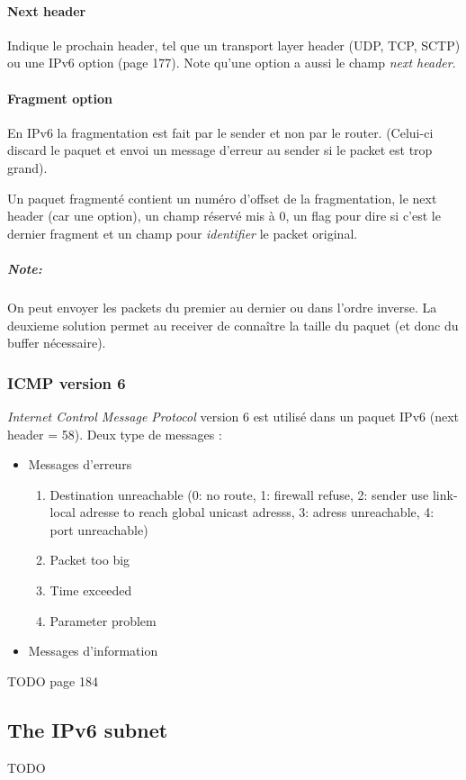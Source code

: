 \paragraph{Next header}
Indique le prochain header, tel que un transport layer header (UDP, TCP, SCTP) ou une
IPv6 option (page 177). Note qu'une option a aussi le champ \textit{next header}.

\paragraph{Fragment option}
En IPv6 la fragmentation est fait par le sender et non par le router. (Celui-ci discard
le paquet et envoi un message d'erreur au sender si le packet est trop grand).

Un paquet fragmenté contient un numéro d'offset de la fragmentation, le next header (car une option), un champ réservé mis à 0, un flag pour dire si c'est le dernier fragment et un
champ pour \textit{identifier} le packet original.

\subparagraph{Note:} On peut envoyer les packets du premier au dernier ou dans l'ordre inverse.
La deuxieme solution permet au receiver de connaître la taille du paquet (et donc du buffer
nécessaire).

\subsubsection{ICMP version 6}
\textit{Internet Control Message Protocol} version 6 est utilisé dans un paquet IPv6
(next header = 58). Deux type de messages :

\begin{itemize}
    \item Messages d'erreurs
        \begin{enumerate}
            \item Destination unreachable (0: no route, 1: firewall refuse, 2: sender use link-local adresse to reach global unicast adresss, 3: adress unreachable, 4: port unreachable)
            \item Packet too big
            \item Time exceeded
            \item Parameter problem
        \end{enumerate}
    \item Messages d'information
\end{itemize}
TODO page 184

\subsection{The IPv6 subnet}
TODO

